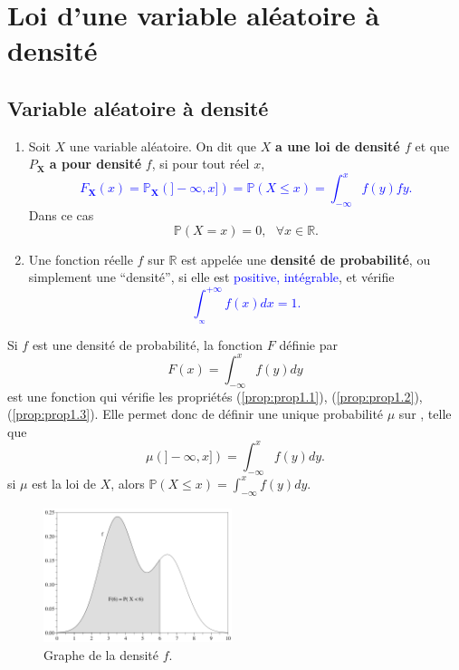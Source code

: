 \section{Loi d’une variable aléatoire à densité}

\subsection{Variable aléatoire à densité}

\theoremstyle{definition}
\begin{definition}

    \begin{enumerate}
        \item Soit $X$ une variable aléatoire. On dit que $X$ \textbf{a une loi de densité $f$}
        et que $P_{\textbf{X}}$  \textbf{a pour densité} $f$, si pour tout réel $x$,
\textcolor{blue}{$$F_{\textbf{X}}(x)=\mathbb{P}_{\textbf{X}}(]-\infty,x])=\mathbb{P}(X\leq x)=\int_{-\infty}^{x}f(y)fy.$$}
       Dans ce cas $$\mathbb{P}(X=x)=0, \mbox{   } \forall x\in \mathbb{R}.$$
        \item  Une fonction réelle $f$ sur $\mathbb{R}$ est appelée une \textbf{densité de probabilité},
ou simplement une “densité”, si elle est \textcolor{blue}{positive, intégrable}, et vérifie
\textcolor{blue}{$$\int_{_\infty}^{+\infty}f(x)dx=1.$$}
    \end{enumerate}
\end{definition}

\theoremstyle{remarkfonda}
\begin{remarkfonda}
Si $f$ est une densité de probabilité, la fonction $F$ définie par $$F(x)=\int_{-\infty}^{x}f(y)dy$$
est une fonction qui vérifie les propriétés (\ref{prop:prop1.1}), (\ref{prop:prop1.2}), (\ref{prop:prop1.3}).
Elle permet donc de définir une unique probabilité $\mu$ sur , telle que $$\mu(]-\infty,x])=\int_{-\infty}^{x}f(y)dy.$$
si $\mu$ est la loi de $X$, alors $\mathbb{P}(X\leq x)=\int_{-\infty}^{x}f(y)dy.$

\begin{figure}[h]
\centering
\includegraphics[width=5.5cm]{content/densite.PNG}
\caption{Graphe de la densité $f$.}
\end{figure}
\end{remarkfonda}

